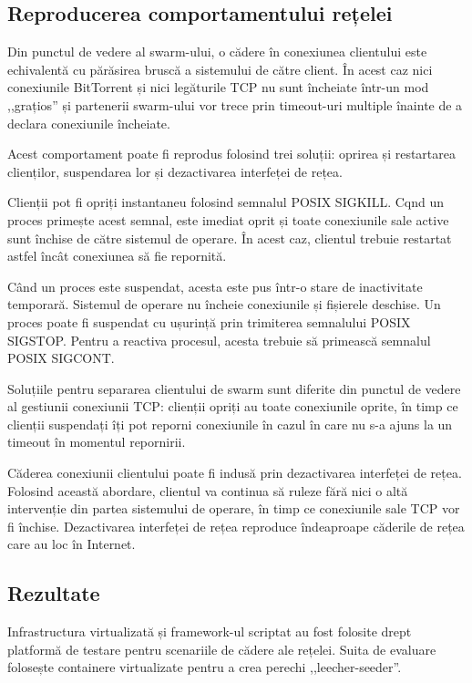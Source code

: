 \subsection{Reproducerea comportamentului rețelei}
\label{subsec:virt-infra:behavior}

Din punctul de vedere al swarm-ului, o cădere în conexiunea clientului
este echivalentă cu părăsirea bruscă a sistemului de către client.
În acest caz nici conexiunile BitTorrent și nici legăturile TCP nu sunt
încheiate într-un mod ,,grațios'' și partenerii swarm-ului vor trece
prin timeout-uri multiple înainte de a declara conexiunile încheiate.

Acest comportament poate fi reprodus folosind trei soluții: oprirea
și restartarea clienților, suspendarea lor și dezactivarea interfeței
de rețea.

Clienții pot fi opriți instantaneu folosind semnalul POSIX SIGKILL.
Cqnd un proces primește acest semnal, este imediat oprit și toate
conexiunile sale active sunt închise de către sistemul de operare.
În acest caz, clientul trebuie restartat astfel încât conexiunea să
fie repornită.

Când un proces este suspendat, acesta este pus într-o stare de inactivitate
temporară. Sistemul de operare nu încheie conexiunile și fișierele
deschise. Un proces poate fi suspendat cu ușurință prin trimiterea semnalului
POSIX SIGSTOP. Pentru a reactiva procesul, acesta trebuie să primească
semnalul POSIX SIGCONT.

Soluțiile pentru separarea clientului de swarm sunt diferite din
punctul de vedere al gestiunii conexiunii TCP: clienții opriți au toate
conexiunile oprite, în timp ce clienții suspendați îți pot reporni
conexiunile în cazul în care nu s-a ajuns la un timeout în momentul
repornirii.

Căderea conexiunii clientului poate fi indusă prin dezactivarea interfeței
de rețea. Folosind această abordare, clientul va continua să ruleze fără
nici o altă intervenție din partea sistemului de operare, în timp ce
conexiunile sale TCP vor fi închise. Dezactivarea interfeței de rețea
reproduce îndeaproape căderile de rețea care au loc în Internet.

\subsection{Rezultate}
\label{subsec:virt-infra:results-dropouts}

Infrastructura virtualizată și framework-ul scriptat au fost folosite
drept platformă de testare pentru scenariile de cădere ale rețelei.
Suita de evaluare folosește containere virtualizate pentru a crea
perechi ,,leecher-seeder''.


